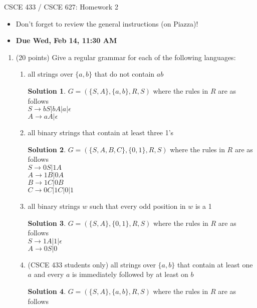 \documentclass[12pt]{article}
\theoremstyle{definition}
\newtheorem*{solution}{Solution}
\begin{document}
\begin{center}
CSCE 433 / CSCE 627:  Homework 2 \\
\end{center}

\begin{itemize}
\item Don't forget to review the general instructions (on Piazza)!

\item {\bf Due Wed, Feb 14, 11:30 AM}
\end{itemize}

\begin{enumerate}

\item (20 points) Give a regular grammar for each of the following
languages:
  \begin{enumerate}
  \item all strings over $\{a,b\}$ that do not contain $ab$
\begin{solution}
	$G = (\{S,A\}, \{a,b\}, R, S)$ where the rules in $R$ are as follows\\ 
	$S \rightarrow bS | bA | a| \epsilon$ \\ 
	$A \rightarrow aA | \epsilon$
	\end{solution}
  \item all binary strings that contain at least three 1's
  \begin{solution}
	$G = (\{S,A,B,C\}, \{0,1\}, R, S)$ where the rules in $R$ are as follows\\ 
	$S \rightarrow 0S | 1A $ \\ 
	$A \rightarrow 1B | 0A$ \\
	$B \rightarrow 1C | 0B$ \\
	$C \rightarrow 0C | 1C | 0 | 1$
	\end{solution}
  \item all binary strings $w$ such that every odd position in $w$ is a 1
    \begin{solution}
	$G = (\{S, A\}, \{0,1\}, R, S)$ where the rules in $R$ are as follows\\ 
	$S \rightarrow 1A | 1 | \epsilon$ \\ 
	$A \rightarrow 0S | 0$ 
	\end{solution}
  \item (CSCE 433 students only) all strings over $\{a,b\}$ that contain
        at least one $a$ and every $a$ is immediately followed by at least
        on $b$
	\begin{solution}
	$G = (\{S,A\}, \{a,b\}, R, S)$ where the rules in $R$ are as follows\\ 

\end{solution}
\end{enumerate}
\end{enumerate}
\end{document}
